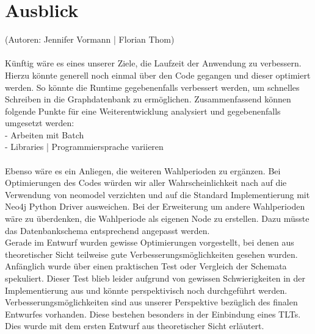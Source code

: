 \section{Ausblick}\label{sec:04_05_ausblick}
(Autoren: Jennifer Vormann | Florian Thom)\\
\\
Künftig wäre es eines unserer Ziele, die Laufzeit der Anwendung zu verbessern. Hierzu könnte generell noch einmal über den Code gegangen und dieser optimiert werden. So könnte die Runtime gegebenenfalls verbessert werden, um schnelles Schreiben in die Graphdatenbank zu ermöglichen. 
Zusammenfassend können folgende Punkte für eine Weiterentwicklung analysiert und gegebenenfalls umgesetzt werden:\\
- Arbeiten mit Batch\\
- Libraries | Programmiersprache variieren \\
\\
Ebenso wäre es ein Anliegen, die weiteren Wahlperioden zu ergänzen. Bei Optimierungen des Codes würden wir aller Wahrscheinlichkeit nach auf die Verwendung von neomodel verzichten und auf die Standard Implementierung mit Neo4j Python Driver ausweichen. Bei der Erweiterung um andere Wahlperioden wäre zu überdenken, die Wahlperiode als eigenen Node zu erstellen. Dazu müsste das Datenbankschema entsprechend angepasst werden.\\
Gerade im Entwurf wurden gewisse Optimierungen vorgestellt, bei denen aus theoretischer Sicht teilweise gute Verbesserungsmöglichkeiten gesehen wurden. Anfänglich wurde über einen praktischen Test oder Vergleich der Schemata spekuliert. Dieser Test blieb leider aufgrund von gewissen Schwierigkeiten in der Implementierung aus und könnte perspektivisch noch durchgeführt werden. Verbesserungsmöglichkeiten sind aus unserer Perspektive bezüglich des finalen Entwurfes vorhanden. Diese bestehen besonders in der Einbindung eines TLTs. Dies wurde mit dem ersten Entwurf aus theoretischer Sicht erläutert.

